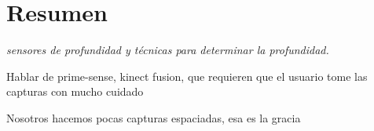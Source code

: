 \documentclass{pfc}
\subtitle{Informe final}
\newcommand{\TODO}[1]{{\color{red}\bfseries#1}}
\newcommand{\Nota}[1]{{\color{blue}\itshape#1}}
\begin{document}
\frontmatter
	\maketitle
	
	\chapter{Resumen}
	\Nota{
		sensores de profundidad y técnicas para determinar la profundidad.

		Hablar de prime-sense, kinect fusion, que requieren que el usuario
		tome las capturas con mucho cuidado

		Nosotros hacemos pocas capturas espaciadas, esa es la gracia
	}

	\tableofcontents
\mainmatter
	
	
	
	
	
	

	
	
\end{document}
